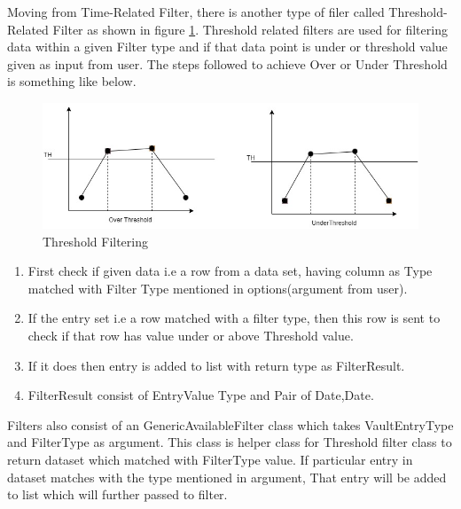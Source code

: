 \documentclass[article,type=msc,colorback,accentcolor=tud9c,twoside,11pt]{tudthesis}
\begin{document}
Moving from Time-Related Filter, there is another type of filer called Threshold-Related Filter as shown in figure \ref{fig:Threshold}. Threshold related filters are used for filtering data within a given Filter type and if that data point is under or threshold value given as input from user. The steps followed to achieve Over or Under Threshold is something like below.
\begin{figure}[h]
	\centering
	\includegraphics[scale=0.7]{Threshold.jpg}
	\caption{Threshold Filtering}
	\label{fig:Threshold}
\end{figure}
\begin{enumerate}
	\item First check if given data i.e a row from a data set, having column as Type matched with Filter Type mentioned in options(argument from user).
	\item If the entry set i.e a row matched with a filter type, then this row is sent to check if that row has value under or above Threshold value.
	\item If it does then entry is added to list with return type as FilterResult.
	\item FilterResult consist of EntryValue Type and Pair of Date,Date.
\end{enumerate}
Filters also consist of an GenericAvailableFilter class which takes VaultEntryType and FilterType as argument. This class is helper class for Threshold filter class to return dataset which matched with FilterType value. If particular entry in dataset matches with the type mentioned in argument, That entry will be added to list which will further passed to filter.
\end{document}

